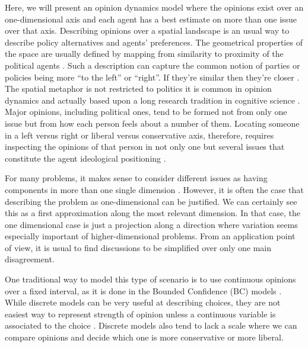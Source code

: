\documentclass{article}
\begin{document}
Here, we will present an opinion dynamics model
\cite{castellanoetal07,galam12a,galametal82,galammoscovici91,sznajd00,deffuantetal00,martins08a}
where the opinions exist over an one-dimensional axis and each agent has a best
estimate on more than one issue over that axis. Describing opinions over a
spatial landscape is an usual way to describe policy alternatives and agents'
preferences. The geometrical properties of the space are usually defined by
mapping from similarity to proximity of the political agents
\cite{downs1957economic, laver2014measuring}. Such a description can capture the
common notion of parties or policies being more ``to the left'' or ``right''. If
they're similar then they're closer \cite{van2005political, miller2015spatial}.
The spatial metaphor is not restricted to politics it is common in opinion
dynamics and actually based upon a long research tradition in cognitive science
\cite{aisbett2001general, attneave1950dimensions,gardenfors2004conceptual}.
Major opinions, including political ones, tend to be formed not from only one
issue but from how each person feels about a number of them. Locating someone in
a left versus right or liberal versus conservative axis, therefore, requires
inspecting the opinions of that person in not only one but several issues that
constitute the agent ideological positioning \cite{benoit2006party}.

For many problems, it makes sense to consider different issues as having
components in more than one single dimension \cite{vicenteetal08b}. However, it
is often the case that describing the problem as one-dimensional can be
justified. We can certainly see this as a first approximation along the most
relevant dimension. In that case, the one dimensional case is just a projection
along a direction where variation seems especially important of
higher-dimensional problems. From an application point of view, it is usual to
find discussions to be simplified over only one main disagreement.

One traditional way to model this type of scenario is to use continuous opinions
over a fixed interval, as it is done in the Bounded Confidence (BC) models
\cite{deffuantetal00,hegselmannkrause02}. While discrete models
\cite{galametal82,galammoscovici91,sznajd00} can be very useful at describing
choices, they are not easiest way to represent strength of opinion unless a
continuous variable is associated to the choice \cite{martins08a}. Discrete
models also tend to lack a scale where we can compare opinions and decide which
one is more conservative or more liberal.
\end{document}
